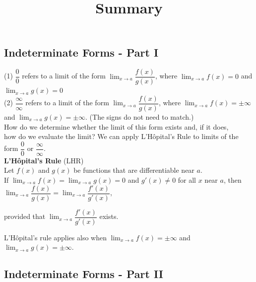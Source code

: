 \documentclass{ximera}
\title[Summary]{Summary}
\begin{document}
\begin{abstract} \end{abstract}
\maketitle

\subsection*{Indeterminate Forms - Part I}

(1) $\dfrac{0}{0}$ refers to a limit of the form $\displaystyle \lim_{x \to a} \dfrac{f(x)}{g(x)}$, where $\displaystyle \lim_{x \to a}f(x)= 0 $ and $\displaystyle \lim_{x \to a}g(x)=0$\\
(2) $\dfrac{\infty}{\infty}$ refers to a limit of the form $\displaystyle \lim_{x \to a} \dfrac{f(x)}{g(x)}$, where $\displaystyle \lim_{x \to a}f(x) = \pm \infty$ and $\displaystyle \lim_{x \to a}g(x)=\pm \infty$. (The signs do not need to match.)\\[0.8em]
How do we determine whether the limit of this form  exists and, if it does, \\how do we evaluate the limit? We can apply L'H\^{o}pital's Rule to limits of the form $\dfrac{0}{0}$  or $\dfrac{\infty}{\infty}$.\\[0.4em]
\textbf{L'H\^{o}pital's Rule} (LHR)\\[0.3em]
Let $f(x)$ and $g(x)$ be functions that are differentiable near $a$.\\  If
$\displaystyle \lim_{x \to a} f(x) = \displaystyle \lim_{x \to a}g(x) = 0$ 
 and $g'(x) \neq 0$
for all $x$ near $a$, then \\

\hspace{1in}$\displaystyle \lim_{x \to a} \dfrac{f(x)}{g(x)} = \displaystyle \lim_{x \to a} \dfrac{f'(x)}{g'(x)}$,

provided that $\displaystyle \lim_{x \to a} \dfrac{f'(x)}{g'(x)}$ exists.

  L'H\^{o}pital's rule applies also when $\displaystyle \lim_{x \to a}f(x) = \pm \infty$ and $\displaystyle \lim_{x \to a}g(x)=\pm \infty$.\\[1em]

\subsection*{Indeterminate Forms - Part II}
\end{document}
